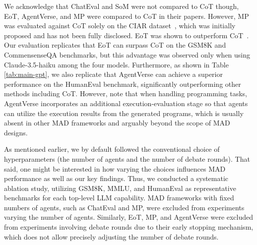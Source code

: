 We acknowledge that ChatEval and SoM were not compared to CoT though, EoT, AgentVerse, and MP were compared to CoT in their papers.
However, MP was evaluated against CoT solely on the CIAR dataset~\citep{liang2023encouraging}, which was initially proposed
and has not been fully disclosed. 
EoT was shown to outperform CoT~\citep{yin2023exchange}. Our evaluation replicates that EoT can surpass CoT on the GSM8K and CommensenseQA benchmarks, but this advantage was observed only when using Claude-3.5-haiku among the four models.
Furthermore, as shown in Table \ref{tab:main-gpt}, we also replicate that AgentVerse can achieve a superior performance on the HumanEval benchmark, significantly outperforming other methods including CoT. 
However, note that when handling programming tasks, AgentVerse incorporates an additional execution-evaluation stage so that agents can utilize the execution results from the generated programs, which is usually absent in other MAD frameworks and arguably beyond the scope of MAD designs.

 As mentioned earlier, we by default followed the conventional choice of hyperparameters (the number of agents and the number of debate rounds). That said, one might be interested in how varying the choices influences MAD performance as well as our key findings. 
Thus, we conducted a systematic ablation study, %
utilizing GSM8K, MMLU, and HumanEval as representative benchmarks for each top-level LLM capability. MAD frameworks with fixed numbers of agents, such as ChatEval and MP, were excluded from experiments varying the number of agents. Similarly, EoT, MP, and AgentVerse were excluded from experiments involving debate rounds due to their early stopping mechanism, which does not allow precisely adjusting the number of debate rounds.

